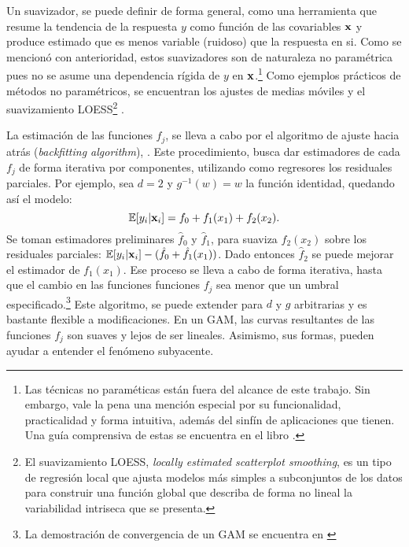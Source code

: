 \documentclass[../Main/Main.tex]{subfiles}
\begin{document}
Un suavizador, se puede definir de forma general, como una herramienta que resume la tendencia de la respuesta $y$ como función de las covariables $\mathbf{x}$ y produce estimado que es menos variable (ruidoso) que la respuesta en si. Como se mencionó con anterioridad, estos suavizadores son de naturaleza no paramétrica pues no se asume una dependencia rígida de $y$ en $\mathbf{x}$.\footnote{Las técnicas no paraméticas están fuera del alcance de este trabajo. Sin embargo, vale la pena una mención especial por su funcionalidad, practicalidad y forma intuitiva, además del sinfín de aplicaciones que tienen. Una guía comprensiva de estas se encuentra en el libro \citet{wasserman2007all}.} Como ejemplos prácticos de métodos no paramétricos, se encuentran los ajustes de medias móviles y el suavizamiento LOESS\footnote{El suavizamiento LOESS, \textit{locally estimated scatterplot smoothing}, es un tipo de regresión local que ajusta modelos más simples a subconjuntos de los datos para construir una función global que describa de forma no lineal la variabilidad intriseca que se presenta.} \autocite{cleveland1988locally}. 

La estimación de las funciones $f_j$, se lleva a cabo por el algoritmo de ajuste hacia atrás (\textit{backfitting algorithm}), \citet{hastie1986generalized}. Este procedimiento, busca dar estimadores de cada $f_j$ de forma iterativa por componentes, utilizando como regresores los residuales parciales. Por ejemplo, sea $d = 2$ y $g^{-1}(w) = w$ la función identidad, quedando así el modelo:
$$\mathbb{E}[y_i|\mathbf{x}_i] = f_0 + f_1(x_1) + f_2(x_2).$$
Se toman estimadores preliminares $\hat{f}_0$ y $\hat{f}_1$, para suaviza $f_2(x_2)$ sobre los residuales parciales: $\mathbb{E}[y_i|\mathbf{x}_i] - (\hat{f}_0 + \hat{f}_1(x_1))$. Dado entonces $\hat{f}_2$ se puede mejorar el estimador de $f_1(x_1)$. Ese proceso se lleva a cabo de forma iterativa, hasta que el cambio en las funciones funciones $f_j$  sea menor que un umbral especificado.\footnote{La demostración de convergencia de un GAM se encuentra en \citet{stone1985additive}} Este algoritmo, se puede extender para $d$ y $g$ arbitrarias y es bastante flexible a modificaciones. En un GAM, las curvas resultantes de las funciones $f_j$ son suaves y lejos de ser lineales. Asimismo, sus formas, pueden ayudar a entender el fenómeno subyacente. 
\end{document}
